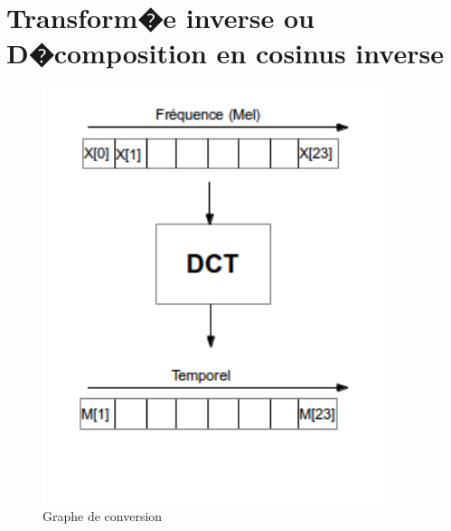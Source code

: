{		\section{Transform�e inverse ou D�composition en cosinus inverse}
\begin{figure}[H]
	\begin{center}
		\includegraphics[width=10cm]{Images/DCTschema.png} 
	\end{center}
	\caption{Graphe de conversion}
\end{figure}
}
